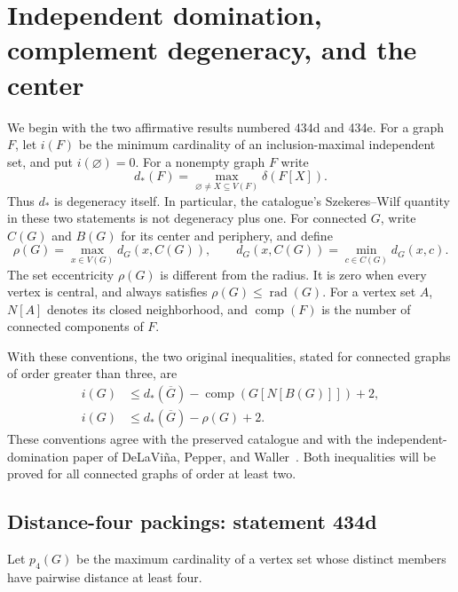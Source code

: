 \documentclass[11pt,a4paper]{article}
\theoremstyle{definition}\newtheorem{definition}[theorem]{Definition}
\theoremstyle{remark}\newtheorem{remark}[theorem]{Remark}
\newcommand{\rad}{\operatorname{rad}}
\begin{document}
\section{Independent domination, complement degeneracy, and the center}
\label{early:sec:independent}

We begin with the two affirmative results numbered 434d and 434e.  For a
graph $F$, let $i(F)$ be the minimum cardinality of an inclusion-maximal
independent set, and put $i(\varnothing)=0$.  For a nonempty graph $F$ write
\[
 d_*(F)=\max_{\varnothing\ne X\subseteq V(F)}\delta(F[X]).
\]
Thus $d_*$ is degeneracy itself.  In particular, the catalogue's
Szekeres--Wilf quantity in these two statements is not degeneracy plus one.
For connected $G$, write $C(G)$ and $B(G)$ for its center and periphery, and
define
\[
 \rho(G)=\max_{x\in V(G)} d_G(x,C(G)),\qquad
 d_G(x,C(G))=\min_{c\in C(G)}d_G(x,c).
\]
The set eccentricity $\rho(G)$ is different from the radius.  It is zero
when every vertex is central, and always satisfies $\rho(G)\leq\rad(G)$.
For a vertex set $A$, $N[A]$ denotes its closed neighborhood, and
$\operatorname{comp}(F)$ is the number of connected components of $F$.

With these conventions, the two original inequalities, stated for connected
graphs of order greater than three, are
\begin{align}
 i(G)&\leq d_*(\overline G)-
       \operatorname{comp}(G[N[B(G)]])+2,\label{early:eq:434d-original}\\
 i(G)&\leq d_*(\overline G)-\rho(G)+2.
       \label{early:eq:434e-original}
\end{align}
These conventions agree with the preserved catalogue and with the
independent-domination paper of DeLaVi\~na, Pepper, and
Waller~\cite{src:catalogue,early:dpw-independent}.  Both inequalities will be
proved for all connected graphs of order at least two.

\subsection{Distance-four packings: statement 434d}

Let $p_4(G)$ be the maximum cardinality of a vertex set whose distinct
members have pairwise distance at least four.
\end{document}
